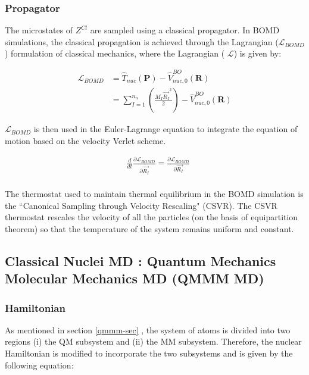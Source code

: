 \subsubsection*{Propagator}

\noindent The microstates of $Z^{Cl}$ are sampled using a classical propagator. In BOMD simulations, the classical propagation is achieved through the Lagrangian ($\mathcal{L}_{BOMD}$) formulation of classical mechanics, where the Lagrangian ( $\mathcal{L}$) is given by:

\begin{align}
    \label{BOMD-2}
    \mathcal{L}_{BOMD}&=\hat{T}_{nuc}(\textbf{P})-\hat{V}^{BO}_{nuc,0}(\textbf{R})\\ 
                       &=\sum_{I=1}^{n_n}(\frac{M_I\Dot{\Vec{R_I}}^2}{2})-\hat{V}^{BO}_{nuc,0}(\textbf{R})
\end{align}

\noindent $\mathcal{L}_{BOMD}$ is then used in the Euler-Lagrange equation to integrate the equation of motion based on the velocity Verlet scheme.

\begin{align}
    \label{BOMD-3}
    &\frac{d}{dt}\frac{\partial \mathcal{L}_{BOMD}}{\partial \Dot{\Vec{R_I}}} = \frac{\partial \mathcal{L}_{BOMD}}{\partial \Vec{R_I}}\\
\end{align}

\noindent The thermostat used to maintain thermal equilibrium in the BOMD simulation is  the ``Canonical Sampling through Velocity Rescaling\cite{bussi2007canonical}" (CSVR). The CSVR thermostat rescales the velocity of all the particles (on the basis of equipartition theorem) so that the temperature of the system remains uniform and constant.  

\subsection{Classical Nuclei MD : Quantum Mechanics Molecular Mechanics MD (QMMM MD)}

\subsubsection{Hamiltonian}
\noindent As mentioned in section \ref{qmmm-sec} , the system of atoms is divided into two regions (i) the QM  subsystem and (ii) the MM subsystem. Therefore, the nuclear Hamiltonian is modified to incorporate the two subsystems and is given by the following equation:

